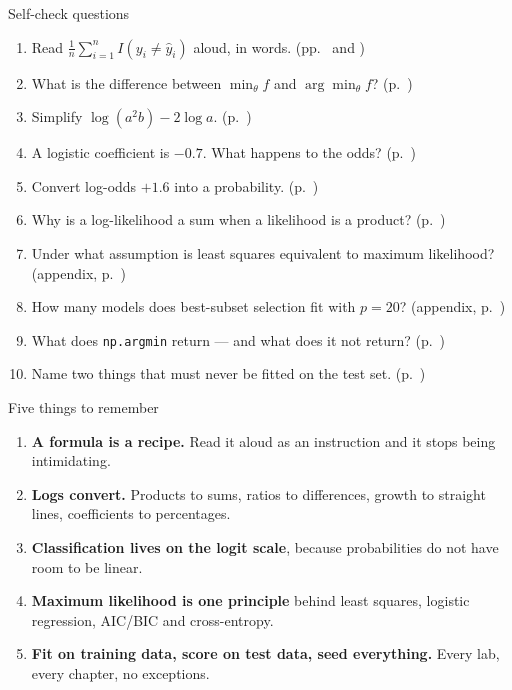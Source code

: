 \documentclass[aspectratio=169,11pt]{beamer}
\begin{document}
\begin{frame}{Self-check questions}
  \begin{enumerate}
    \item Read $\frac{1}{n}\sum_{i=1}^{n} I(y_i \ne \hat y_i)$ aloud, in words.
          (pp.~\pageref{frm:sums} and \pageref{frm:argmin})
    \item What is the difference between $\min_\theta f$ and
          $\arg\min_\theta f$? (p.~\pageref{frm:argmin})
    \item Simplify $\log(a^2 b) - 2\log a$. (p.~\pageref{frm:logexp})
    \item A logistic coefficient is $-0.7$. What happens to the odds? (p.~\pageref{frm:oddsratio})
    \item Convert log-odds $+1.6$ into a probability. (p.~\pageref{frm:threeways})
    \item Why is a log-likelihood a sum when a likelihood is a product? (p.~\pageref{frm:mle})
    \item Under what assumption is least squares equivalent to maximum
          likelihood? (appendix, p.~\pageref{frm:lsml})
    \item How many models does best-subset selection fit with $p = 20$?
          (appendix, p.~\pageref{frm:counting})
    \item What does \texttt{np.argmin} return --- and what does it not
          return? (p.~\pageref{frm:argmin})
    \item Name two things that must never be fitted on the test set. (p.~\pageref{frm:contract})
  \end{enumerate}
\end{frame}

\begin{frame}{Five things to remember}
  \begin{enumerate}
    \item \textbf{A formula is a recipe.} Read it aloud as an instruction and
          it stops being intimidating.
    \item \textbf{Logs convert.} Products to sums, ratios to differences,
          growth to straight lines, coefficients to percentages.
    \item \textbf{Classification lives on the logit scale}, because
          probabilities do not have room to be linear.
    \item \textbf{Maximum likelihood is one principle} behind least squares,
          logistic regression, AIC/BIC and cross-entropy.
    \item \textbf{Fit on training data, score on test data, seed everything.}
          Every lab, every chapter, no exceptions.
  \end{enumerate}
\end{frame}
\end{document}
